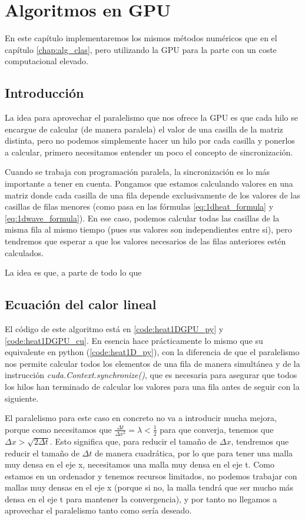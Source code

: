 \chapter{Algoritmos en GPU}\label{chap:alg_gpu}
\begin{resumen}
	En este capítulo implementaremos los mismos métodos numéricos que en el capítulo \ref{chap:alg_clas}, pero utilizando la GPU para la parte con un coste computacional elevado.
\end{resumen}
\section{Introducción}
La idea para aprovechar el paralelismo que nos ofrece la GPU es que cada hilo se encargue de calcular (de manera paralela) el valor de una casilla de la matriz distinta, pero no podemos simplemente hacer un hilo por cada casilla y ponerlos a calcular, primero necesitamos entender un poco el concepto de sincronización.

Cuando se trabaja con programación paralela, la sincronización es lo más importante a tener en cuenta. Pongamos que estamos calculando valores en una matriz donde cada casilla de una fila depende exclusivamente de los valores de las casillas de filas menores (como pasa en las fórmulas \ref{eq:1dheat_formula} y \ref{eq:1dwave_formula}). En ese caso, podemos calcular todas las casillas de la misma fila al mismo tiempo (pues sus valores son independientes entre si), pero tendremos que esperar a que los valores necesarios de las filas anteriores estén calculados.

La idea es que, a parte de todo lo que 

\section{Ecuación del calor lineal}
El código de este algoritmo está en \ref{code:heat1DGPU_py} y \ref{code:heat1DGPU_cu}. En esencia hace prácticamente lo mismo que su equivalente en python (\ref{code:heat1D_py}), con la diferencia de que el paralelismo nos permite calcular todos los elementos de una fila de manera simultánea y de la instrucción \textit{cuda.Context.synchronize()}, que es necesaria para asegurar que todos los hilos han terminado de calcular los valores para una fila antes de seguir con la siguiente.

El paralelismo para este caso en concreto no va a introducir mucha mejora, porque como necesitamos que $\frac{\Delta t}{\Delta x^2}=\lambda<\frac{1}{2}$ para que converja, tenemos que $\Delta x > \sqrt{2\Delta t}$. Esto significa que, para reducir el tamaño de $\Delta x$, tendremos que reducir el tamaño de $\Delta t$ de manera cuadrática, por lo que para tener una malla muy densa en el eje x, necesitamos una malla muy densa en el eje t. Como estamos en un ordenador y tenemos recursos limitados, no podemos trabajar con mallas muy densas en el eje x (porque si no, la malla tendrá que ser mucho más densa en el eje t para mantener la convergencia), y por tanto no llegamos a aprovechar el paralelismo tanto como sería deseado.

